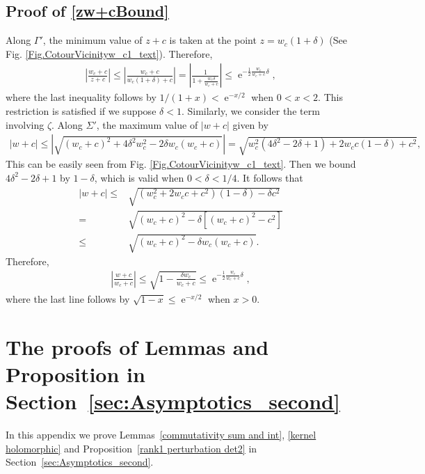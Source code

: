 \documentclass[cmp]{svjour}
\numberwithin{theorem}{section}
\numberwithin{equation}{section}
\DeclareMathOperator{\e}{e}
\begin{document}
\subsection{Proof of \eqref{zw+cBound}}\label{appx:zw+cBound}
Along $\Gamma'$, the minimum value of $z+c$ is taken at the point $z = w_c ( 1+ \delta)$ (See Fig. \ref{Fig.CotourVicinityw_c1_text}). Therefore,  
\begin{align*}
	\left| \frac{w_c + c}{z + c}\right| \leq \left| \frac{w_c + c}{w_c(1 + \delta)  + c}\right| = 
	\left| \frac{1}{ 1 + \frac{w_c\delta}{w_c + c}}\right| \leq \e^{-\frac{1}{2}\frac{w_c}{w_c + c} \delta},
\end{align*}
where the last inequality follows by $1/(1+x) < \e^{-x/2}$ when $0<x<2$. This restriction is satisfied if we suppose $\delta < 1$. Similarly, we consider the term involving $\zeta$. Along $\Sigma'$, the maximum value of $|w +c|$ given by 
\begin{align*}
	\left|w + c\right| \leq 
	\left|\sqrt{(w_c+c)^2 + 4 \delta^2 w_c^2 - 2 \delta w_c(w_c+c)}\right|
	= 
	\sqrt{w_c^2(4\delta^2 - 2\delta +1) +2w_cc(1-\delta) +c^2},
\end{align*}
This can be easily seen from Fig. \ref{Fig.CotourVicinityw_c1_text}.
Then we bound $4\delta^2-2\delta+1$ by $1-\delta$, which is valid when $0 < \delta < 1/4$. It follows that 
\begin{align*}
	|w+c|
	\leq &
	\sqrt{(w_c^2+2w_cc+c^2)(1-\delta)-\delta c^2}
	\\
	= &
	\sqrt{(w_c + c)^2 -\delta [(w_c + c)^2-c^2]} \\
	\leq &
	\sqrt{(w_c + c)^2 -\delta w_c(w_c + c)}.
\end{align*}
Therefore, 
\begin{align*}
	\left|\frac{w + c}{w_c + c}\right| \leq \sqrt{1- \frac{\delta w_c}{w_c +c}} \leq \e^{-\frac{1}{2}\frac{w_c}{w_c + c}\delta},
\end{align*}
where the last line follows by $\sqrt{1-x} \leq \e^{-x/2}$ when $x>0$.






\section{The proofs of Lemmas and Proposition in Section~\ref{sec:Asymptotics_second}}

In this appendix we prove Lemmas~\ref{commutativity sum and int}, \ref{kernel holomorphic} and Proposition~\ref{rank1 perturbation det2} in Section~\ref{sec:Asymptotics_second}.
\end{document}
